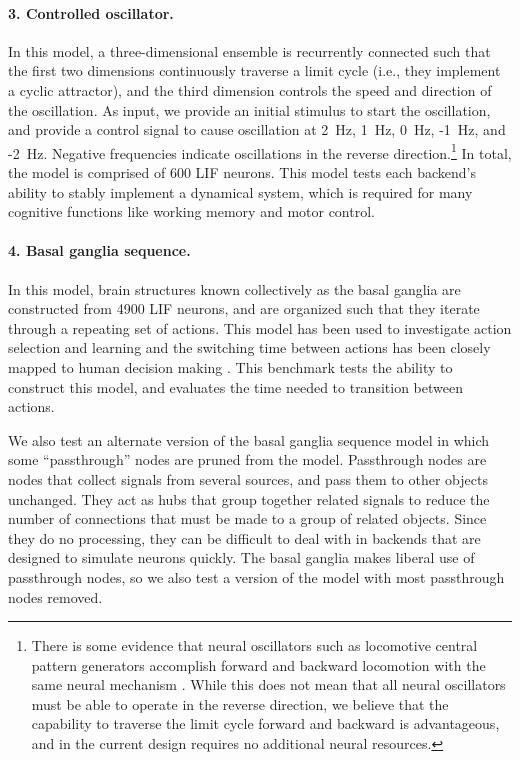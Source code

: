 \documentclass{frontiersSCNS}
\begin{document}
\paragraph{3. Controlled oscillator.}
In this model,
a three-dimensional ensemble is recurrently connected
such that the first two dimensions continuously
traverse a limit cycle
(i.e., they implement a cyclic attractor),
and the third dimension controls the speed
and direction of the oscillation.
As input, we provide an initial stimulus
to start the oscillation,
and provide a control signal
to cause oscillation at
2~Hz, 1~Hz, 0~Hz, -1~Hz, and -2~Hz.
Negative frequencies indicate oscillations
in the reverse direction.\footnote{There is some evidence
  that neural oscillators such as locomotive central pattern generators
  accomplish forward and backward locomotion
  with the same neural mechanism \citep{duysens1998}.
  While this does not mean that all neural oscillators must
  be able to operate in the reverse direction,
  we believe that the capability to traverse
  the limit cycle forward and backward is advantageous,
  and in the current design requires no additional neural resources.}
In total, the model is comprised of 600 LIF neurons.
This model tests each backend's ability
to stably implement a dynamical system,
which is required for many cognitive functions
like working memory and motor control.

\paragraph{4. Basal ganglia sequence.}
In this model, brain structures
known collectively as the basal ganglia
are constructed from 4900 LIF neurons,
and are organized such that they iterate
through a repeating set of actions.
This model has been used to investigate
action selection and learning \citep{stewart2012a}
and the switching time between actions
has been closely mapped to human decision making
\citep{stewart2010}.
This benchmark tests the ability
to construct this model,
and evaluates the time needed
to transition between actions.

We also test an alternate version
of the basal ganglia sequence model
in which some ``passthrough'' nodes
are pruned from the model.
Passthrough nodes are nodes
that collect signals from several sources,
and pass them to other objects unchanged.
They act as hubs
that group together related signals
to reduce the number of connections
that must be made to
a group of related objects.
Since they do no processing,
they can be difficult to deal with
in backends that are designed to
simulate neurons quickly.
The basal ganglia makes liberal use
of passthrough nodes,
so we also test a version of the model
with most passthrough nodes removed.
\end{document}
